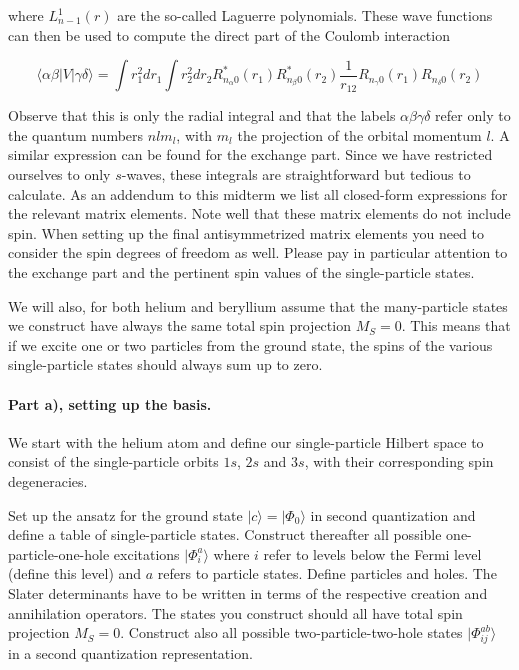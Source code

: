 \documentclass[a4,10pt]{article}
\begin{document}
where $L_{n-1}^1(r)$ are the so-called Laguerre polynomials.  These
wave functions can then be used to compute the direct part of the
Coulomb interaction

\begin{equation*}
\langle \alpha\beta| V| \gamma\delta\rangle = \int r_1^2dr_1 \int r_2^2dr_2R_{n_{\alpha}0}^*(r_1) R_{n_{\beta}0}^*(r_2) 
  \frac{1}{r_{12}}R_{n_{\gamma}0}(r_1)R_{n_{\delta}0}(r_2)
\end{equation*}

Observe that this is only the radial integral and that the labels
$\alpha\beta\gamma\delta$ refer only to the quantum numbers $nlm_l$,
with $m_l$ the projection of the orbital momentum $l$.  A similar
expression can be found for the exchange part. Since we have
restricted ourselves to only $s$-waves, these integrals are
straightforward but tedious to calculate. As an addendum to this
midterm we list all closed-form expressions for the relevant matrix
elements. Note well that these matrix elements do not include
spin. When setting up the final antisymmetrized matrix elements you
need to consider the spin degrees of freedom as well. Please pay in
particular attention to the exchange part and the pertinent
spin values of the single-particle states.

We will also, for both helium and beryllium assume that the
many-particle states we construct have always the same total spin
projection $M_S=0$. This means that if we excite one or two particles
from the ground state, the spins of the various single-particle states
should always sum up to zero.

\paragraph{Part a), setting up the basis.}
We start with the helium atom and define our single-particle Hilbert
space to consist of the single-particle orbits $1s$, $2s$ and $3s$,
with their corresponding spin degeneracies.

Set up the ansatz for the ground state $|c\rangle = |\Phi_0\rangle$ in
second quantization and define a table of single-particle
states. Construct thereafter all possible one-particle-one-hole
excitations $|\Phi_i^a\rangle$ where $i$ refer to levels below the
Fermi level (define this level) and $a$ refers to particle
states. Define particles and holes. The Slater determinants have to be
written in terms of the respective creation and annihilation
operators.  The states you construct should all have total spin
projection $M_S=0$.  Construct also all possible two-particle-two-hole
states $|\Phi_{ij}^{ab}\rangle$ in a second quantization
representation.
\end{document}

